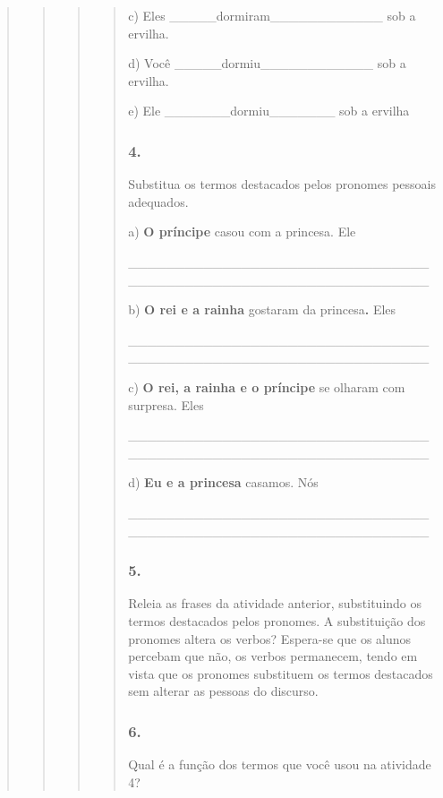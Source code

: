 \begin{quote}
\begin{quote}
\begin{quote}
\begin{quote}
c) Eles \_\_\_\_\_dormiram\_\_\_\_\_\_\_\_\_\_\_\_ sob a ervilha.

d) Você \_\_\_\_\_dormiu\_\_\_\_\_\_\_\_\_\_\_\_ sob a ervilha.

e) Ele \_\_\_\_\_\_\_dormiu\_\_\_\_\_\_\_ sob a ervilha

\subsubsection{4. }\label{section-74}

Substitua os termos destacados pelos pronomes pessoais adequados.

a) \textbf{O príncipe} casou com a princesa. Ele

\_\_\_\_\_\_\_\_\_\_\_\_\_\_\_\_\_\_\_\_\_\_\_\_\_\_\_\_\_\_\_\_\_\_\_\_\_\_\_\_\_\_\_\_\_\_\_\_\_\_\_\_\_\_\_\_\_\_\_\_\_\_\_\_

b) \textbf{O rei e a rainha} gostaram da princesa\textbf{.} Eles

\_\_\_\_\_\_\_\_\_\_\_\_\_\_\_\_\_\_\_\_\_\_\_\_\_\_\_\_\_\_\_\_\_\_\_\_\_\_\_\_\_\_\_\_\_\_\_\_\_\_\_\_\_\_\_\_\_\_\_\_\_\_\_\_

c) \textbf{O rei, a rainha e o príncipe} se olharam com surpresa. Eles

\_\_\_\_\_\_\_\_\_\_\_\_\_\_\_\_\_\_\_\_\_\_\_\_\_\_\_\_\_\_\_\_\_\_\_\_\_\_\_\_\_\_\_\_\_\_\_\_\_\_\_\_\_\_\_\_\_\_\_\_\_\_\_\_

d) \textbf{Eu e a princesa} casamos. Nós

\_\_\_\_\_\_\_\_\_\_\_\_\_\_\_\_\_\_\_\_\_\_\_\_\_\_\_\_\_\_\_\_\_\_\_\_\_\_\_\_\_\_\_\_\_\_\_\_\_\_\_\_\_\_\_\_\_\_\_\_\_\_\_\_

\subsubsection{5. }\label{section-75}

Releia as frases da atividade anterior, substituindo os termos
destacados pelos pronomes. A substituição dos pronomes altera os verbos?
Espera-se que os alunos percebam que não, os verbos permanecem, tendo em
vista que os pronomes substituem os termos destacados sem alterar as
pessoas do discurso.

\subsubsection{6. }\label{section-76}

Qual é a função dos termos que você usou na atividade 4?


\end{quote}
\end{quote}
\end{quote}
\end{quote}
